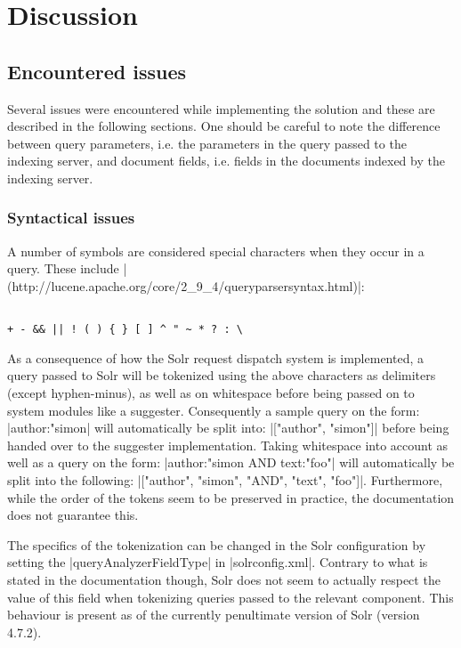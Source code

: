\section{Discussion}\label{discussion}

\subsection{Encountered issues}

Several issues were encountered while implementing the solution and these are described in the following sections. One should be careful to note the difference between query parameters, i.e. the parameters in the query passed to the indexing server, and document fields, i.e. fields in the documents indexed by the indexing server.

\subsubsection{Syntactical issues}

A number of symbols are considered special characters when they occur in a query. These include |(http://lucene.apache.org/core/2_9_4/queryparsersyntax.html)|:
\begin{verbatim}

+ - && || ! ( ) { } [ ] ^ " ~ * ? : \
\end{verbatim}

As a consequence of how the Solr request dispatch system is implemented, a query passed to Solr will be tokenized using the above characters as delimiters (except hyphen-minus), as well as on whitespace before being passed on to system modules like a suggester.
Consequently a sample query on the form: |author:"simon| will automatically be split into: |["author", "simon"]|
before being handed over to the suggester implementation.
Taking whitespace into account as well as a query on the form: |author:"simon AND text:"foo"| will automatically be split into the following: |["author", "simon", "AND", "text", "foo"]|.
Furthermore, while the order of the tokens seem to be preserved in practice, the documentation does not guarantee this.

The specifics of the tokenization can be changed in the Solr configuration by setting the |queryAnalyzerFieldType| in |solrconfig.xml|. Contrary to what is stated in the documentation though, Solr does not seem to actually respect the value of this field when tokenizing queries passed to the relevant component. This behaviour is present as of the currently penultimate version of Solr (version 4.7.2).

